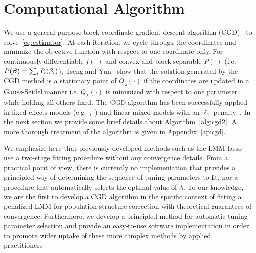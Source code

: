 \section{Computational Algorithm} \label{sec:section3}


We use a general purpose block coordinate gradient descent algorithm (CGD)~\citep{tseng2009coordinate} to solve~\eqref{eq:estimator}. At each iteration, we cycle through the coordinates and minimize the objective function with respect to one coordinate only. For continuously differentiable $f(\cdot)$ and convex and block-separable $P(\cdot)$ \mbox{(i.e. $P(\boldsymbol{\beta}) = \sum_i P_i (\beta_i)$)}, Tseng and Yun~\cite{tseng2009coordinate} show that the solution generated by the CGD method is a stationary point of $Q_{\lambda}(\cdot)$ if the coordinates are updated in a Gauss-Seidel manner i.e. $Q_{\lambda}(\cdot)$ is minimized with respect to one parameter while holding all others fixed. The CGD algorithm has been successfully applied in fixed effects models (e.g.~\cite{meier2008group},~\cite{friedman2010regularization}) and linear mixed models with an $\ell_1$ penalty~\cite{schelldorfer2011estimation}. In the next section we provide some brief details about Algorithm~\ref{alg:cgd2}. A more thorough treatment of the algorithm is given in Appendix~\ref{ap:cgd}. 

We emphasize here that previously developed methods such as the LMM-lasso~\citep{rakitsch2013lasso} use a two-stage fitting procedure without any convergence details. 
From a practical point of view, there is currently no implementation that provides a principled way of determining the sequence of tuning parameters to fit, nor a procedure that automatically selects the optimal value of $\lambda$.  
To our knowledge, we are the first to develop a CGD algorithm in the specific context of fitting a penalized LMM for population structure correction with theoretical guarantees of convergence. Furthermore, we develop a principled method for automatic tuning parameter selection and provide an easy-to-use software implementation in order to promote wider uptake of these more complex methods by applied practitioners.   

